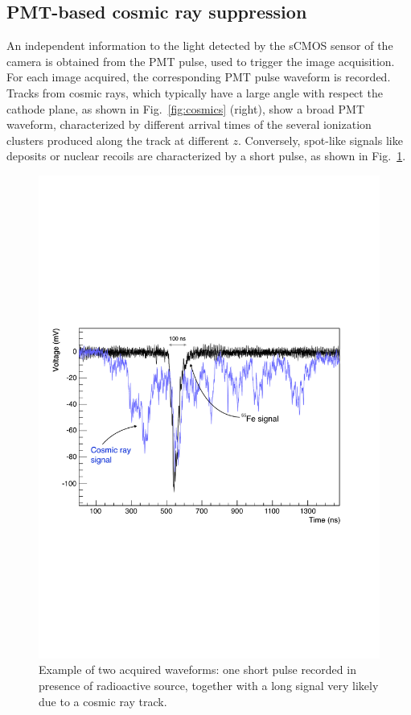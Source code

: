 \subsection{PMT-based cosmic ray suppression}
An independent information to the light detected by the sCMOS sensor
of the camera is obtained from the PMT pulse, used to trigger the
image acquisition. For each image acquired, the corresponding PMT
pulse waveform is recorded.  Tracks from cosmic rays, which typically
have a large angle with respect the cathode plane, as shown in
Fig.~\ref{fig:cosmics} (right), show a broad PMT waveform,
characterized by different arrival times of the several ionization
clusters produced along the track at different $z$. Conversely,
spot-like signals like \fe deposits or nuclear recoils are
characterized by a short pulse, as shown in Fig.~\ref{fig:waveforms}.
%
\begin{figure}[ht]
  \begin{center}
    \includegraphics[width=0.69\linewidth]{figures/Waveforms.pdf}

    \caption{Example of two acquired waveforms: one short pulse
  recorded in presence of \fe radioactive source, together with a long
  signal very likely due to a cosmic ray
  track.  \label{fig:waveforms}}

  \end{center}
\end{figure}

